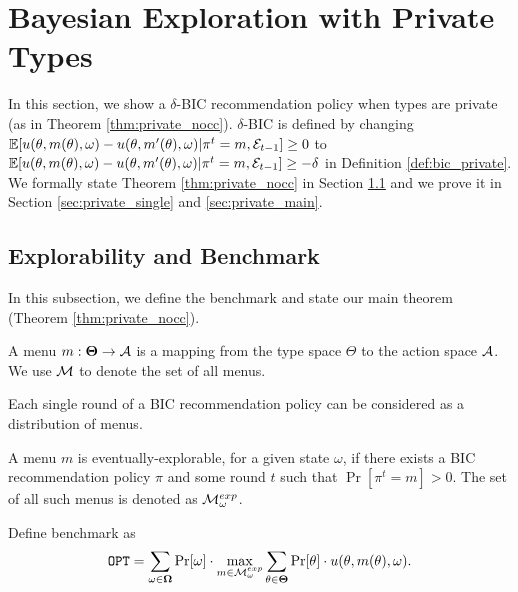 
\section{Bayesian Exploration with Private Types}
\label{sec:private_nc}

In this section, we show a $\delta$-BIC recommendation policy when types are private (as in Theorem \ref{thm:private_nocc}). $\delta$-BIC is defined by changing $\mathbb{E}[ u(\theta,m(\theta),\omega) - u(\theta,m'(\theta),\omega)| \pi^t = m, \mathcal{E}_{t-1}] \geq 0$ to $\mathbb{E}[ u(\theta,m(\theta),\omega) - u(\theta,m'(\theta),\omega)| \pi^t = m, \mathcal{E}_{t-1}] \geq -\delta$ in Definition \ref{def:bic_private}. We formally state Theorem \ref{thm:private_nocc} in Section \ref{sec:private_bench} and we prove it in Section \ref{sec:private_single} and \ref{sec:private_main}.

\subsection{Explorability and Benchmark}
\label{sec:private_bench}
In this subsection, we define the benchmark and state our main theorem (Theorem \ref{thm:private_nocc}). 

\begin{definition}
A menu $m: \bold{\Theta} \rightarrow \mathcal{A}$ is a mapping from the type space $\varTheta$ to the action space $\mathcal{A}$. We use $\mathcal{M}$ to denote the set of all menus.
\end{definition}

\begin{claim}
Each single round of a BIC recommendation policy can be considered as a distribution of menus.
\end{claim}

\begin{definition}
\label{def:private_exp}
A menu $m$ is eventually-explorable, for a given state $\omega$, if there exists a BIC recommendation policy $\pi$ and some round $t$ such that $\Pr[\pi^t= m]> 0$. The set of all such menus is denoted as $\mathcal{M}_{\omega}^{exp}$.
\end{definition}

\begin{definition}[Benchmark]
Define benchmark as 
\[
\mathtt{OPT} = \sum_{\omega\in \bold{\Omega}} \Pr[\omega] \cdot\max_{m \in \mathcal{M}_{\omega}^{exp}}\sum_{\theta \in \bold{\Theta}} \Pr[\theta] \cdot  u(\theta, m(\theta), \omega).
\]
\end{definition}

